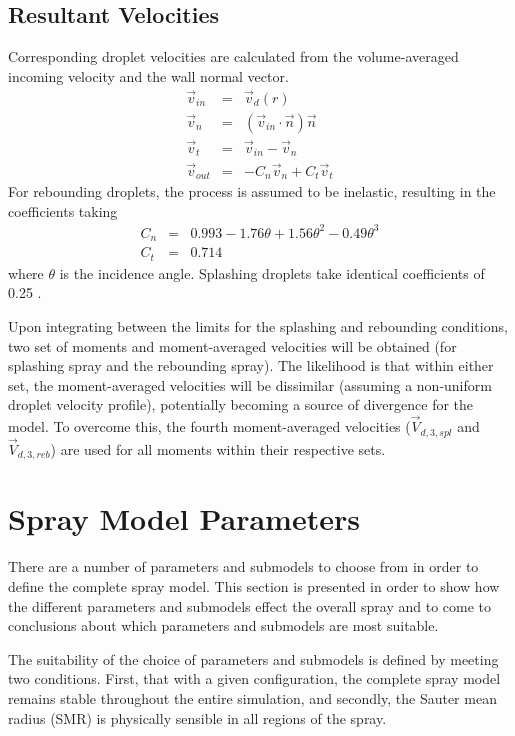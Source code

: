 \documentclass[a4paper,10pt]{article}
\begin{document}
\subsection{Resultant Velocities}
Corresponding droplet velocities are calculated from the volume-averaged incoming velocity and the wall normal vector.
\begin{eqnarray}
\vec{v}_{in} &=& \vec{v}_{d}(r) \label{eqn:vel_in}\\
\vec{v}_{n} &=& \left( \vec{v}_{in} \cdot \vec{n} \right) \vec{n} \\
\vec{v}_{t} &=& \vec{v}_{in} - \vec{v}_{n} \\
\vec{v}_{out} &=& -C_{n} \vec{v}_{n} +C_{t} \vec{v}_{t}
\end{eqnarray}
For rebounding droplets, the process is assumed to be inelastic, resulting in the coefficients taking
\begin{eqnarray}
C_{n} &=& 0.993-1.76\theta+1.56\theta^{2}-0.49\theta^{3} \\
C_{t} &=& 0.714
\end{eqnarray}
where $ \theta $ is the incidence angle.  Splashing droplets take identical coefficients of 0.25 \cite{lemini2002}.

Upon integrating between the limits for the splashing and rebounding conditions, two set of moments and moment-averaged velocities will be obtained (for splashing spray and the rebounding spray). The likelihood is that within either set, the moment-averaged velocities will be dissimilar (assuming a non-uniform droplet velocity profile), potentially becoming a source of divergence for the model. To overcome this, the fourth moment-averaged velocities ($\vec{V}_{d,3,spl}$ and $\vec{V}_{d,3,reb}$) are used for all moments within their respective sets.



\section{Spray Model Parameters} \label{sec:model_param}
There are a number of parameters and submodels to choose from in order to define the complete spray model. This section is presented in order to show how the different parameters and submodels effect the overall spray and to come to conclusions about which parameters and submodels are most suitable.

The suitability of the choice of parameters and submodels is defined by meeting two conditions. First, that with a given configuration, the complete spray model remains stable throughout the entire simulation, and secondly, the Sauter mean radius (SMR) is physically sensible in all regions of the spray.
\end{document}
